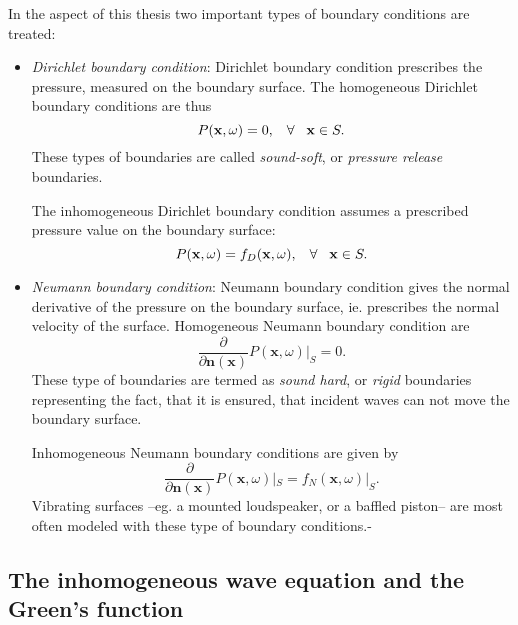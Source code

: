 In the aspect of this thesis two important types of boundary conditions are treated:
\begin{itemize}
\item \emph{Dirichlet boundary condition}:
Dirichlet boundary condition prescribes the pressure, measured on the boundary surface. The homogeneous Dirichlet boundary conditions are thus
\begin{equation}
P(\mathbf{x},\omega) = 0, \hspace{3mm} \forall \hspace{3mm} \mathbf{x} \in S.
\end{equation}
These types of boundaries are called \emph{sound-soft}, or \emph{pressure release} boundaries.

The inhomogeneous Dirichlet boundary condition assumes a prescribed pressure value on the boundary surface:
\begin{equation}
P(\mathbf{x},\omega) = f_D(\mathbf{x},\omega), \hspace{3mm} \forall \hspace{3mm} \mathbf{x} \in S.
\end{equation}

\item \emph{Neumann boundary condition}:
Neumann boundary condition gives the normal derivative of the pressure on the boundary surface, ie. prescribes the normal velocity of the surface.
Homogeneous Neumann boundary condition are
\begin{equation}
\frac{\partial}{\partial \mathbf{n}(\mathbf{x})}P(\mathbf{x},\omega)|_{S} = 0.
\end{equation}
These type of boundaries are termed as \emph{sound hard}, or \emph{rigid} boundaries representing the fact, that it is ensured, that incident waves can not move the boundary surface.

Inhomogeneous Neumann boundary conditions are given by
\begin{equation}
\frac{\partial}{\partial \mathbf{n}(\mathbf{x})}P(\mathbf{x},\omega)|_{S} = f_N(\mathbf{x},\omega)|_{S}.
\end{equation}
Vibrating surfaces --eg. a mounted loudspeaker, or a baffled piston-- are most often modeled with these type of boundary conditions.-

\end{itemize}

\newpage
\subsection{The inhomogeneous wave equation and the Green's function}

